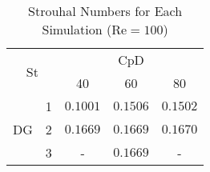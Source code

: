 \begin{table}[H]
	\centering
	\def\arraystretch{1.5}
	\begin{tabular}{|c|c|c|c|c|}
		\hline
		\multicolumn{2}{|c|}{\multirow{2}{*}{St}} & \multicolumn{3}{c|}{CpD} \\ \cline{3-5} 
		\multicolumn{2}{|c|}{}                       & 40     & 60    & 80    \\ \hline
		\multirow{3}{*}{DG}            & 1           &    $0.1001$    &    $0.1506$   &    $0.1502$    \\ \cline{2-5} 
		& 2           &     $0.1669$   &    $0.1669$   &     $0.1670$   \\ \cline{2-5} 
		& 3           &     -   &    $0.1669$   &    -    \\ \hline
	\end{tabular}
	\caption{Strouhal Numbers for Each Simulation ($\text{Re} = 100$)}	
	\label{Str100}
\end{table}
\newpage

